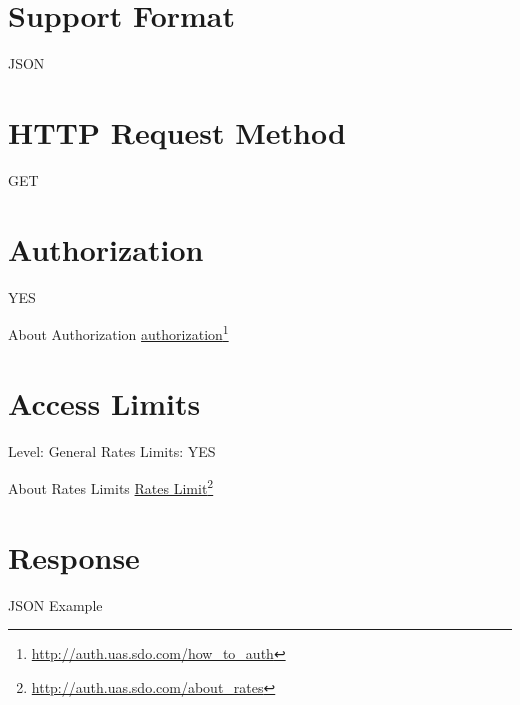 \section{Support Format}
\label{supportformat}

JSON

\section{HTTP Request Method}
\label{httprequestmethod}

GET

\section{Authorization}
\label{authorization}

YES

About Authorization \href{http://auth.uas.sdo.com/how_to_auth}{authorization}\footnote{\href{http://auth.uas.sdo.com/how_to_auth}{http:/\slash auth.uas.sdo.com\slash how\_to\_auth}}

\section{Access Limits}
\label{accesslimits}

Level: General
Rates Limits: YES

About Rates Limits \href{http://auth.uas.sdo.com/about_rates}{Rates Limit}\footnote{\href{http://auth.uas.sdo.com/about_rates}{http:/\slash auth.uas.sdo.com\slash about\_rates}}

\section{Response}
\label{response}

JSON Example

